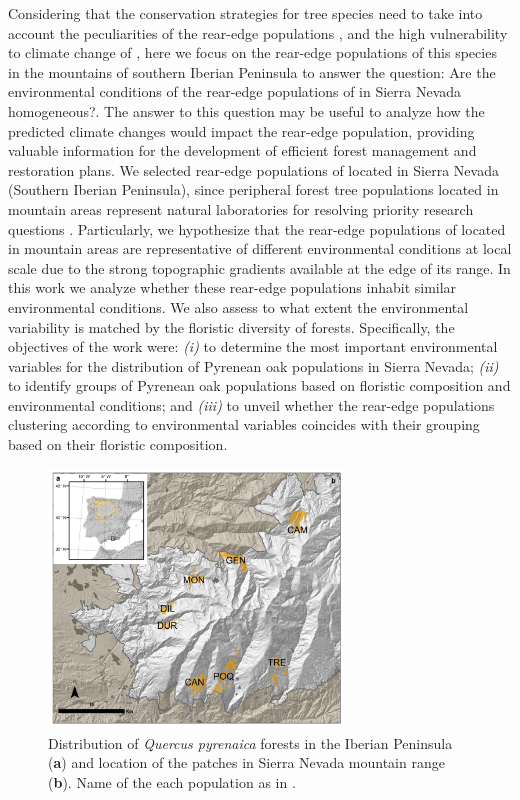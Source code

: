 Considering that the conservation strategies for tree species need to take into account the peculiarities of the rear-edge populations \autocite{HampePetit2005ConservingBiodiversity,Fadyetal2016EvolutionbasedApproach,Rehmetal2015LosingYour}, and the high vulnerability to climate change of \Qp \autocite{GarciaValdesetal2013ChasingMoving}, here we focus on the rear-edge populations of this species in the mountains of southern Iberian Peninsula to answer the question: Are the environmental conditions of the rear-edge populations of \Qp in Sierra Nevada homogeneous?. The answer to this question may be useful to analyze how the predicted climate changes would impact the rear-edge population, providing valuable information for the development of efficient forest management and restoration plans. We selected rear-edge populations of \Qp located in Sierra Nevada (Southern Iberian Peninsula), since peripheral forest tree populations located in mountain areas represent natural laboratories for resolving priority research questions \autocite{Fadyetal2016EvolutionbasedApproach}. Particularly, we hypothesize that the rear-edge populations of \Qp located in mountain areas are representative of different environmental conditions at local scale due to the strong topographic gradients available at the edge of its range. In this work we analyze whether these rear-edge populations inhabit similar environmental conditions. We also assess to what extent the environmental variability is matched by the floristic diversity of \Qp forests. Specifically, the objectives of the work were: \emph{(i)} to determine the most important environmental variables for the distribution of Pyrenean oak populations in Sierra Nevada; \emph{(ii)} to identify groups of Pyrenean oak populations based on floristic composition and environmental conditions; and \emph{(iii)} to unveil whether the rear-edge populations clustering according to environmental variables coincides with their grouping based on their floristic composition.

\begin{figure}
	\centering
	\includegraphics[width=0.7\textwidth]{img/multivariante/dist_map_multivariante} \caption{Distribution of \textit{Quercus pyrenaica} forests in the Iberian Peninsula (\textbf{a}) and location of the patches in Sierra Nevada mountain range (\textbf{b}). Name of the each population as in .}\label{fig:multivar:location-map}
\end{figure}


